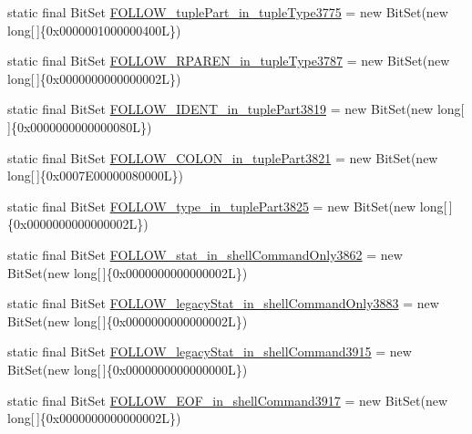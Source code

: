 \begin{DoxyCompactItemize}
static final Bit\-Set \hyperlink{classorg_1_1tzi_1_1use_1_1parser_1_1testsuite_1_1_test_suite_parser_a0df9c6f97d5e64e87fa17c1855a55c21}{F\-O\-L\-L\-O\-W\-\_\-tuple\-Part\-\_\-in\-\_\-tuple\-Type3775} = new Bit\-Set(new long\mbox{[}$\,$\mbox{]}\{0x0000001000000400\-L\})
\item 
static final Bit\-Set \hyperlink{classorg_1_1tzi_1_1use_1_1parser_1_1testsuite_1_1_test_suite_parser_a02265603de8507bbbfab84fdb3a0dad7}{F\-O\-L\-L\-O\-W\-\_\-\-R\-P\-A\-R\-E\-N\-\_\-in\-\_\-tuple\-Type3787} = new Bit\-Set(new long\mbox{[}$\,$\mbox{]}\{0x0000000000000002\-L\})
\item 
static final Bit\-Set \hyperlink{classorg_1_1tzi_1_1use_1_1parser_1_1testsuite_1_1_test_suite_parser_abb9bb031a8a7c7ab2c596a197f1c0d35}{F\-O\-L\-L\-O\-W\-\_\-\-I\-D\-E\-N\-T\-\_\-in\-\_\-tuple\-Part3819} = new Bit\-Set(new long\mbox{[}$\,$\mbox{]}\{0x0000000000000080\-L\})
\item 
static final Bit\-Set \hyperlink{classorg_1_1tzi_1_1use_1_1parser_1_1testsuite_1_1_test_suite_parser_a054767c75300ab3c6b965d6e568ab967}{F\-O\-L\-L\-O\-W\-\_\-\-C\-O\-L\-O\-N\-\_\-in\-\_\-tuple\-Part3821} = new Bit\-Set(new long\mbox{[}$\,$\mbox{]}\{0x0007\-E00000080000\-L\})
\item 
static final Bit\-Set \hyperlink{classorg_1_1tzi_1_1use_1_1parser_1_1testsuite_1_1_test_suite_parser_aca677e77e4bcf011c88ab99ac3b03a6e}{F\-O\-L\-L\-O\-W\-\_\-type\-\_\-in\-\_\-tuple\-Part3825} = new Bit\-Set(new long\mbox{[}$\,$\mbox{]}\{0x0000000000000002\-L\})
\item 
static final Bit\-Set \hyperlink{classorg_1_1tzi_1_1use_1_1parser_1_1testsuite_1_1_test_suite_parser_a9e71782f86d5b0161482a427309ab2e0}{F\-O\-L\-L\-O\-W\-\_\-stat\-\_\-in\-\_\-shell\-Command\-Only3862} = new Bit\-Set(new long\mbox{[}$\,$\mbox{]}\{0x0000000000000002\-L\})
\item 
static final Bit\-Set \hyperlink{classorg_1_1tzi_1_1use_1_1parser_1_1testsuite_1_1_test_suite_parser_a6900894397246d9edcf1831f815c7f78}{F\-O\-L\-L\-O\-W\-\_\-legacy\-Stat\-\_\-in\-\_\-shell\-Command\-Only3883} = new Bit\-Set(new long\mbox{[}$\,$\mbox{]}\{0x0000000000000002\-L\})
\item 
static final Bit\-Set \hyperlink{classorg_1_1tzi_1_1use_1_1parser_1_1testsuite_1_1_test_suite_parser_a4160b756bb3a9e35fe04ecf61f0b860c}{F\-O\-L\-L\-O\-W\-\_\-legacy\-Stat\-\_\-in\-\_\-shell\-Command3915} = new Bit\-Set(new long\mbox{[}$\,$\mbox{]}\{0x0000000000000000\-L\})
\item 
static final Bit\-Set \hyperlink{classorg_1_1tzi_1_1use_1_1parser_1_1testsuite_1_1_test_suite_parser_a60caae64bfc0dfdaf5803b7372bef5b4}{F\-O\-L\-L\-O\-W\-\_\-\-E\-O\-F\-\_\-in\-\_\-shell\-Command3917} = new Bit\-Set(new long\mbox{[}$\,$\mbox{]}\{0x0000000000000002\-L\})

\end{DoxyCompactItemize}
